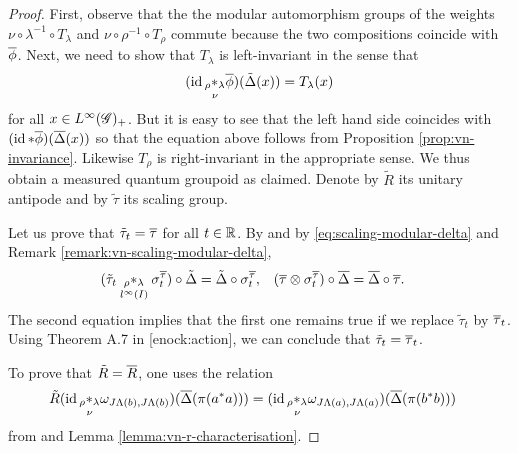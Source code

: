 \begin{proof}
  First, observe that the  the modular
  automorphism groups of the weights $\nu \circ \lambda^{-1} \circ
  T_{\lambda}$ and $\nu \circ \rho^{-1} \circ T_{\rho}$ commute  because the two
  compositions coincide with $\overline{\phi}$. Next, we need  to show that
  $T_{\lambda}$ is left-invariant in the sense that
  \begin{align*}
   (\operatorname{id} \underset{\nu}{_{\rho}\ast_{\lambda}} \overline{\phi})(\tilde\Delta(x)) = T_{\lambda}(x) 
  \end{align*}
  for all $x\in L^{\infty}(\mathscr{G})_{+}$. But it is easy to see that the left hand
  side coincides with $(\operatorname{id} \ast \overline{\phi})(\overline{\Delta}(x))$ so that the
  equation above follows from Proposition
  \ref{prop:vn-invariance}. Likewise $T_{\rho}$ is right-invariant in
  the appropriate sense. We thus obtain a measured quantum groupoid as
  claimed.  Denote by $\tilde R$ its unitary antipode and by
  $\tilde\tau$ its scaling group.

  Let us prove that $\tilde \tau_{t}=\overline{\tau}$ for all $t\in \mathbb{R}$. By
  \cite{} and by \eqref{eq:scaling-modular-delta} and Remark
  \ref{remark:vn-scaling-modular-delta},
  \begin{align*}
    (\tilde \tau_{t} \underset{l^{\infty}(I)}{_{\rho}\ast_{\lambda}} \sigma^{\overline{\tau}}_{t}) \circ \tilde \Delta
    &=\tilde \Delta \circ \sigma^{\overline{\tau}}_{t}, & (\overline{\tau} \otimes
    \sigma^{\overline{\tau}}_{t}) \circ \overline{\Delta} &= \overline{\Delta} \circ \overline{\tau}.
  \end{align*}
  The second equation implies that the first one remains true if we
  replace $\tilde\tau_{t}$ by $\overline{\tau}_{t}$.  Using Theorem A.7 in
  \cite{} [enock:action], we can conclude that $\tilde
  \tau_{t}=\overline{\tau}_{t}$.

 To prove that $\tilde R=\overline{R}$, one uses the relation
  \begin{align*}
    \tilde R(\operatorname{id} \underset{\nu}{_{\rho} \ast_{\lambda}}
    \omega_{J\Lambda(b),J\Lambda(b)})(\overline{\Delta}(\pi(a^{*}a))) &= (\operatorname{id}
    \underset{\nu}{_{\rho} \ast_{\lambda}}
    \omega_{J\Lambda(a),J\Lambda(a)})(\overline{\Delta}(\pi(b^{*}b)))
  \end{align*}
from \cite{} and Lemma \ref{lemma:vn-r-characterisation}.
\end{proof}

